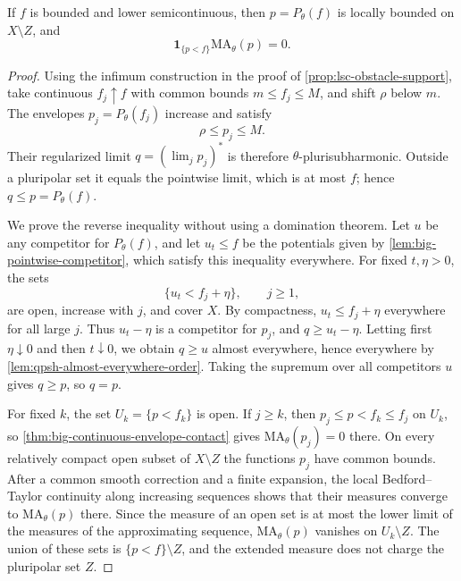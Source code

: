 \begin{proposition}\label{prop:big-bounded-lsc-contact}
If $f$ is bounded and lower semicontinuous, then $p=P_\theta(f)$ is locally bounded on $X\setminus Z$, and
\[
 \mathbf1_{\{p<f\}}\mathrm{MA}_\theta(p)=0.
\]
\end{proposition}
\begin{proof}
Using the infimum construction in the proof of \cref{prop:lsc-obstacle-support}, take continuous $f_j\uparrow f$ with common bounds $m\leq f_j\leq M$, and shift $\rho$ below $m$. The envelopes $p_j=P_\theta(f_j)$ increase and satisfy
\[
 \rho\leq p_j\leq M.
\]
Their regularized limit $q=(\lim_jp_j)^*$ is therefore $\theta$-plurisubharmonic. Outside a pluripolar set it equals the pointwise limit, which is at most $f$; hence $q\leq p=P_\theta(f)$.

We prove the reverse inequality without using a domination theorem. Let $u$ be any competitor for $P_\theta(f)$, and let $u_t\leq f$ be the potentials given by \cref{lem:big-pointwise-competitor}, which satisfy this inequality everywhere. For fixed $t,\eta>0$, the sets
\[
 \{u_t<f_j+\eta\},\qquad j\geq1,
\]
are open, increase with $j$, and cover $X$. By compactness, $u_t\leq f_j+\eta$ everywhere for all large $j$. Thus $u_t-\eta$ is a competitor for $p_j$, and $q\geq u_t-\eta$. Letting first $\eta\downarrow0$ and then $t\downarrow0$, we obtain $q\geq u$ almost everywhere, hence everywhere by \cref{lem:qpsh-almost-everywhere-order}. Taking the supremum over all competitors $u$ gives $q\geq p$, so $q=p$.

For fixed $k$, the set $U_k=\{p<f_k\}$ is open. If $j\geq k$, then $p_j\leq p<f_k\leq f_j$ on $U_k$, so \cref{thm:big-continuous-envelope-contact} gives $\mathrm{MA}_\theta(p_j)=0$ there. On every relatively compact open subset of $X\setminus Z$ the functions $p_j$ have common bounds. After a common smooth correction and a finite expansion, the local Bedford--Taylor continuity along increasing sequences shows that their measures converge to $\mathrm{MA}_\theta(p)$ there. Since the measure of an open set is at most the lower limit of the measures of the approximating sequence, $\mathrm{MA}_\theta(p)$ vanishes on $U_k\setminus Z$. The union of these sets is $\{p<f\}\setminus Z$, and the extended measure does not charge the pluripolar set $Z$.
\end{proof}

